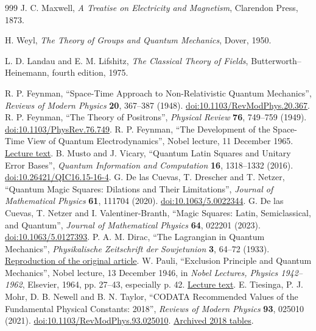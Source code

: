 \begin{thebibliography}{999}
J. C. Maxwell,
\emph{A Treatise on Electricity and Magnetism},
Clarendon Press, 1873.

H. Weyl,
\emph{The Theory of Groups and Quantum Mechanics},
Dover, 1950.

L. D. Landau and E. M. Lifshitz,
\emph{The Classical Theory of Fields},
Butterworth--Heinemann, fourth edition, 1975.

 R. P. Feynman, ``Space-Time Approach to Non-Relativistic Quantum Mechanics'', \emph{Reviews of Modern Physics} \textbf{20}, 367--387 (1948). \href{https://doi.org/10.1103/RevModPhys.20.367}{doi:10.1103/RevModPhys.20.367}.
 R. P. Feynman, ``The Theory of Positrons'', \emph{Physical Review} \textbf{76}, 749--759 (1949). \href{https://doi.org/10.1103/PhysRev.76.749}{doi:10.1103/PhysRev.76.749}.
 R. P. Feynman, ``The Development of the Space-Time View of Quantum Electrodynamics'', Nobel lecture, 11 December 1965. \href{https://www.nobelprize.org/prizes/physics/1965/feynman/lecture/}{Lecture text}.
 B. Musto and J. Vicary, ``Quantum Latin Squares and Unitary Error Bases'', \emph{Quantum Information and Computation} \textbf{16}, 1318--1332 (2016). \href{https://doi.org/10.26421/QIC16.15-16-4}{doi:10.26421/QIC16.15-16-4}.
 G. De las Cuevas, T. Drescher and T. Netzer, ``Quantum Magic Squares: Dilations and Their Limitations'', \emph{Journal of Mathematical Physics} \textbf{61}, 111704 (2020). \href{https://doi.org/10.1063/5.0022344}{doi:10.1063/5.0022344}.
 G. De las Cuevas, T. Netzer and I. Valentiner-Branth, ``Magic Squares: Latin, Semiclassical, and Quantum'', \emph{Journal of Mathematical Physics} \textbf{64}, 022201 (2023). \href{https://doi.org/10.1063/5.0127393}{doi:10.1063/5.0127393}.
 P. A. M. Dirac, ``The Lagrangian in Quantum Mechanics'', \emph{Physikalische Zeitschrift der Sowjetunion} \textbf{3}, 64--72 (1933). \href{https://www.informationphilosopher.com/solutions/scientists/dirac/Lagrangian_1933.pdf}{Reproduction of the original article}.
 W. Pauli, ``Exclusion Principle and Quantum Mechanics'', Nobel lecture, 13 December 1946, in \emph{Nobel Lectures, Physics 1942--1962}, Elsevier, 1964, pp. 27--43, especially p. 42. \href{https://www.nobelprize.org/uploads/2018/06/pauli-lecture.pdf}{Lecture text}.
 E. Tiesinga, P. J. Mohr, D. B. Newell and B. N. Taylor, ``CODATA Recommended Values of the Fundamental Physical Constants: 2018'', \emph{Reviews of Modern Physics} \textbf{93}, 025010 (2021). \href{https://doi.org/10.1103/RevModPhys.93.025010}{doi:10.1103/RevModPhys.93.025010}. \href{https://physics.nist.gov/cuu/Constants/ArchiveASCII/allascii_2018.txt}{Archived 2018 tables}.

\end{thebibliography}
